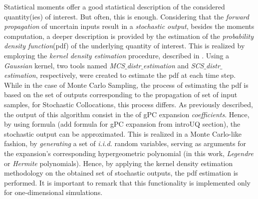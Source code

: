 	Statistical moments offer a good statistical description of the considered quantity(ies) of interest. But often, this is enough. Considering that the \emph{forward propagation} of uncertain inputs result in a \emph{stochastic output},  besides the moments computation, a deeper description is  provided by the estimation of the \emph{probability density function}(pdf) of the underlying quantity of interest. This is realized by employing the \emph{kernel density estimation} procedure, described in . Using a \emph{Gaussian} kernel, two tools named \emph{MCS$\_$distr$\_$estimation} and \emph{SCS$\_$distr$\_$estimation}, respectively, were created to estimate the pdf at each time step. While in the case of Monte Carlo Sampling, the process of estimating the pdf is based on the set of outputs corresponding to the propagation of set of input samples, for Stochastic Collocations, this process differs. As previously described, the output of this algorithm consist in the of gPC expansion \emph{coefficients}. Hence, by using formula (add formula for gPC expansion from introUQ section), the stochastic output can be approximated. This is realized in a Monte Carlo-like fashion, by \emph{generating} a set of \emph{i.i.d.} random variables, serving as arguments for the expansion's corresponding hypergeometric polynomial (in this work, \emph{Legendre} or \emph{Hermite} polynomials). Hence, by applying the kernel density estimation methodology on the obtained set of stochastic outputs, the pdf estimation is performed. It is important to remark that this functionality is implemented only for one-dimensional simulations.
	
	